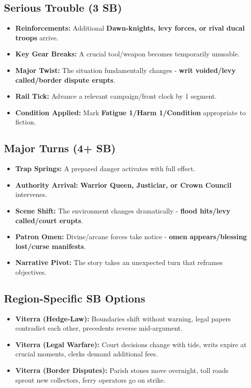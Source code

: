 \subsection*{Serious Trouble (3 SB)}
\begin{itemize}
\item \textbf{Reinforcements:} Additional \textbf{Dawn-knights, levy forces, or rival ducal troops} arrive.
\item \textbf{Key Gear Breaks:} A crucial tool/weapon becomes temporarily unusable.
\item \textbf{Major Twist:} The situation fundamentally changes - \textbf{writ voided/levy called/border dispute erupts}.
\item \textbf{Rail Tick:} Advance a relevant campaign/front clock by 1 segment.
\item \textbf{Condition Applied:} Mark \textbf{Fatigue 1/Harm 1/Condition} appropriate to fiction.
\end{itemize}

\subsection*{Major Turns (4+ SB)}
\begin{itemize}
\item \textbf{Trap Springs:} A prepared danger activates with full effect.
\item \textbf{Authority Arrival:} \textbf{Warrior Queen, Justiciar, or Crown Council} intervenes.
\item \textbf{Scene Shift:} The environment changes dramatically - \textbf{flood hits/levy called/court erupts}.
\item \textbf{Patron Omen:} Divine/arcane forces take notice - \textbf{omen appears/blessing lost/curse manifests}.
\item \textbf{Narrative Pivot:} The story takes an unexpected turn that reframes objectives.
\end{itemize}

\subsection*{Region-Specific SB Options}
\begin{itemize}
\item \textbf{Viterra (Hedge-Law):} Boundaries shift without warning, legal papers contradict each other, precedents reverse mid-argument.
\item \textbf{Viterra (Legal Warfare):} Court decisions change with tide, writs expire at crucial moments, clerks demand additional fees.
\item \textbf{Viterra (Border Disputes):} Parish stones move overnight, toll roads sprout new collectors, ferry operators go on strike.
\end{itemize}


